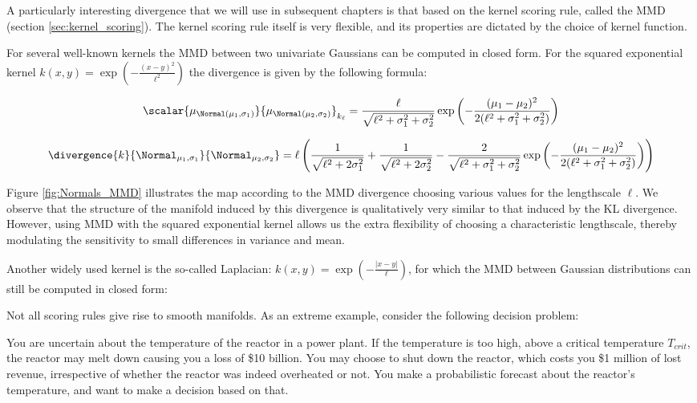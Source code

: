 A particularly interesting divergence that we will use in subsequent chapters is that based on the kernel scoring rule, called the MMD (section \ref{sec:kernel_scoring}). The kernel scoring rule itself is very flexible, and its properties are dictated by the choice of kernel function.

For several well-known kernels the MMD between two univariate Gaussians can be computed in closed form. For the squared exponential kernel $k(x,y)=\exp(-\frac{(x-y)^2}{\ell^2})$ the divergence is given by the following formula:

\begin{align}
	\scalar{\mu_{\Normal(\mu_1,\sigma_1)}}{\mu_{\Normal(\mu_2,\sigma_2)}}_{k_{\ell}} = \frac{\ell}{\sqrt{\ell^2 + \sigma_1^2 + \sigma_2^2}}\exp\left(-\frac{(\mu_1 - \mu_2)^2}{2(\ell^2 + \sigma_1^2 + \sigma_2^2)}\right)
\end{align}	


\begin{equation}
	\divergence{k}{\Normal_{\mu_1,\sigma_1}}{\Normal_{\mu_2,\sigma_2}} = \ell\left(\frac{1}{\sqrt{\ell^2+2\sigma_1^2}} + \frac{1}{\sqrt{\ell^2+2\sigma_2^2}} - \frac{2}{\sqrt{\ell^2+\sigma_1^2 + \sigma_2^2}}\exp\left(-\frac{(\mu_1 - \mu_2)^2}{2(\ell^2 + \sigma_1^2 + \sigma_2^2)}\right)\right)
\end{equation}

Figure \ref{fig:Normals_MMD} illustrates the map according to the MMD divergence choosing various values for the lengthscale $\ell$.   We observe that the structure of the manifold induced by this divergence is qualitatively very similar to that induced by the KL divergence. However, using MMD with the squared exponential kernel allows us the extra flexibility of choosing a characteristic lengthscale, thereby modulating the sensitivity to small differences in variance and mean.

Another widely used kernel is the so-called Laplacian: $k(x,y)=\exp\left(-\frac{\vert x-y\vert}{\ell}\right)$, for which the MMD between Gaussian distributions can still be computed in closed form:


Not all scoring rules give rise to smooth manifolds. As an extreme example, consider the following decision problem:

You are uncertain about the temperature of the reactor in a power plant. If the temperature is too high, above a critical temperature $T_{crit}$, the reactor may melt down causing you a loss of \$10 billion. You may choose to shut down the reactor, which costs you \$1 million of lost revenue, irrespective of whether the reactor was indeed overheated or not. You make a probabilistic forecast about the reactor's temperature, and want to make a decision based on that.

